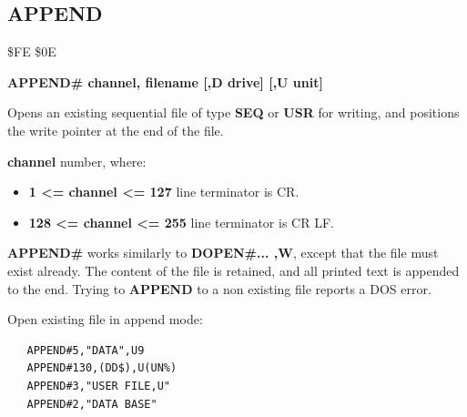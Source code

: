\subsection{APPEND}
\begin{description}[leftmargin=2cm,style=nextline]
\item [Token:] \$FE \$0E
\item [Format:]
  {\bf APPEND\# channel, filename [,D drive] [,U unit] }
\item [Usage:]
   Opens an existing sequential file of type
   {\bf SEQ} or {\bf USR} for writing, and positions the write pointer
   at the end of the file.

    {\bf channel} number, where:
    \begin{itemize}
        \item {\bf 1 <= channel <= 127} line terminator is CR.
        \item {\bf 128 <= channel <= 255} line terminator is CR LF.
    \end{itemize}

   \filenamedefinition

   \drivedefinition

   \unitdefinition

\item [Remarks:]
   {\bf APPEND\#} works similarly to {\bf DOPEN\#... ,W},
   except that the file must exist already.
   The content of the file is retained, and all printed text
   is appended to the end.
   Trying to {\bf APPEND} to a non existing file reports a DOS error.

\item [Examples:] Open existing file in append mode:

\begin{tcolorbox}[colback=black,coltext=white]
\verbatimfont{\codefont}
\begin{verbatim}
   APPEND#5,"DATA",U9
   APPEND#130,(DD$),U(UN%)
   APPEND#3,"USER FILE,U"
   APPEND#2,"DATA BASE"
\end{verbatim}
\end{tcolorbox}
\end{description}


\newpage
